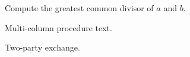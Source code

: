 \documentclass{article}
\begin{document}
\begin{algorithm}[htbp]
\caption{Euclid's algorithm for $\gcd(a,b)$}\label{alg:euclid}
Compute the greatest common divisor of $a$ and $b$.
\end{algorithm}

\begin{algorithm*}[t]
\caption[Short title]{Wide algorithm across columns}
Multi-column procedure text.
\end{algorithm*}

\begin{algorithm}[h]
\caption{Handshake protocol}\label{alg:handshake}
Two-party exchange.
\end{algorithm}
\end{document}
